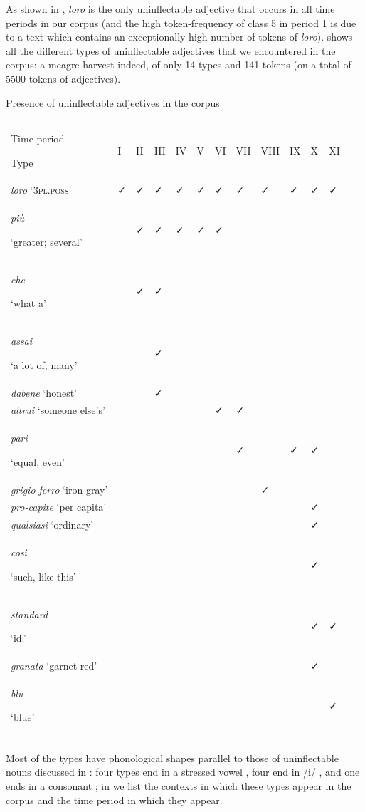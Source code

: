 \documentclass[output=paper]{langscibook}
\begin{document}
As shown in , \textit{loro} is the only uninflectable adjective that occurs in all time periods in our corpus (and the high token-frequency of class 5 in period 1 is due to a text which contains an exceptionally high number of tokens of \textit{loro}).  shows all the different types of uninflectable adjectives that we encountered in the corpus: a meagre harvest indeed, of only 14 types and 141 tokens (on a total of 5500 tokens of adjectives).

 Presence of uninflectable adjectives in the corpus 


\begin{tabularx}{\textwidth}{XXXXXXXXXXXX}

\lsptoprule

{\raggedleft Time period}

Type & I & II & III & IV & V & VI & VII & VIII & IX & X & XI\\
\textit{loro} \textsc{‘3pl.poss’} & ✓ & ✓ & ✓ & ✓ & ✓ & ✓ & ✓ & ✓ & ✓ & ✓ & ✓\\
\textit{più} 

‘greater; several’ & ~ & ✓ & ✓ & ✓ & ✓ & ✓ & ~ & ~ & ~ & ~ & ~\\
\textit{che} 

‘what a’ & ~ & ✓ & ✓ & ~ & ~ & ~ & ~ & ~ & ~ & ~ & ~\\
\textit{assai} 

‘a lot of, many’ & ~ & ~ & ✓ & ~ & ~ & ~ & ~ & ~ & ~ & ~ & ~\\
\textit{dabene} ‘honest’ & ~ & ~ & ✓ & ~ & ~ & ~ & ~ & ~ & ~ & ~ & ~\\
\textit{altrui} ‘someone else’s’ & ~ & ~ & ~ & ~ & ~ & ✓ & ✓ & ~ & ~ & ~ & ~\\
\textit{pari} 

‘equal, even’ & ~ & ~ & ~ & ~ & ~ & ~ & ✓ & ~ & ✓ & ✓ & ~\\
\textit{grigio ferro} ‘iron gray’ & ~ & ~ & ~ & ~ & ~ & ~ & ~ & ✓ & ~ & ~ & ~\\
\textit{pro-capite} ‘per capita’ & ~ & ~ & ~ & ~ & ~ & ~ & ~ & ~ & ~ & ✓ & ~\\
\textit{qualsiasi} ‘ordinary’ & ~ & ~ & ~ & ~ & ~ & ~ & ~ & ~ & ~ & ✓ & ~\\
\textit{così} 

‘such, like this’ & ~ & ~ & ~ & ~ & ~ & ~ & ~ & ~ & ~ & ✓ & ~\\
\textit{standard} 

‘id.’ & ~ & ~ & ~ & ~ & ~ & ~ & ~ & ~ & ~ & ✓ & ✓\\
\textit{granata} ‘garnet red’ & ~ & ~ & ~ & ~ & ~ & ~ & ~ & ~ & ~ & ✓ & ~\\
\textit{blu} 

‘blue’ & ~ & ~ & ~ & ~ & ~ & ~ & ~ & ~ & ~ & ~ & ✓\\
\lspbottomrule
\end{tabularx}
 Most of the types have phonological shapes parallel to those of uninflectable nouns discussed in : four types end in a stressed vowel , four end in /i/ , and one ends in a consonant ; in  we list the contexts in which these types appear in the corpus and the time period in which they appear.
\end{document}
